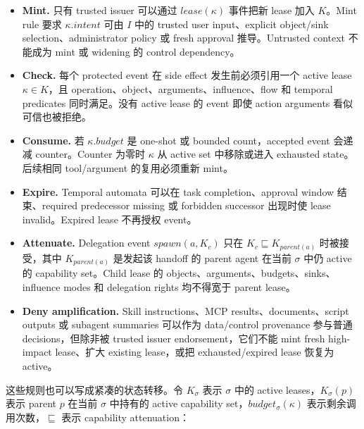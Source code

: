 \documentclass[UTF8,a4paper,11pt]{ctexart}
\begin{document}
\begin{itemize}[leftmargin=*]
  \item \textbf{Mint.} 只有 trusted issuer 可以通过 \(lease(\kappa)\) 事件把新 lease 加入 \(K\)。Mint rule 要求 \(\kappa.intent\) 可由 \(I\) 中的 trusted user input、explicit object/sink selection、administrator policy 或 fresh approval 推导。Untrusted context 不能成为 mint 或 widening 的 control dependency。
  \item \textbf{Check.} 每个 protected event 在 side effect 发生前必须引用一个 active lease \(\kappa \in K\)，且 operation、object、arguments、influence、flow 和 temporal predicates 同时满足。没有 active lease 的 event 即使 action arguments 看似可信也被拒绝。
  \item \textbf{Consume.} 若 \(\kappa.budget\) 是 one-shot 或 bounded count，accepted event 会递减 counter。Counter 为零时 \(\kappa\) 从 active set 中移除或进入 exhausted state。后续相同 tool/argument 的复用必须重新 mint。
  \item \textbf{Expire.} Temporal automata 可以在 task completion、approval window 结束、required predecessor missing 或 forbidden successor 出现时使 lease invalid。Expired lease 不再授权 event。
  \item \textbf{Attenuate.} Delegation event \(spawn(a,K_c)\) 只在 \(K_c \sqsubseteq K_{parent(a)}\) 时被接受，其中 \(K_{parent(a)}\) 是发起该 handoff 的 parent agent 在当前 \(\sigma\) 中仍 active 的 capability set。Child lease 的 objects、arguments、budgets、sinks、influence modes 和 delegation rights 均不得宽于 parent lease。
  \item \textbf{Deny amplification.} Skill instructions、MCP results、documents、script outputs 或 subagent summaries 可以作为 data/control provenance 参与普通 decisions，但除非被 trusted issuer endorsement，它们不能 mint fresh high-impact lease、扩大 existing lease，或把 exhausted/expired lease 恢复为 active。
\end{itemize}

这些规则也可以写成紧凑的状态转移。令 \(K_\sigma\) 表示 \(\sigma\) 中的 active leases，\(K_\sigma(p)\) 表示 parent \(p\) 在当前 \(\sigma\) 中持有的 active capability set，\(budget_\sigma(\kappa)\) 表示剩余调用次数，\(\sqsubseteq\) 表示 capability attenuation：
\end{document}
